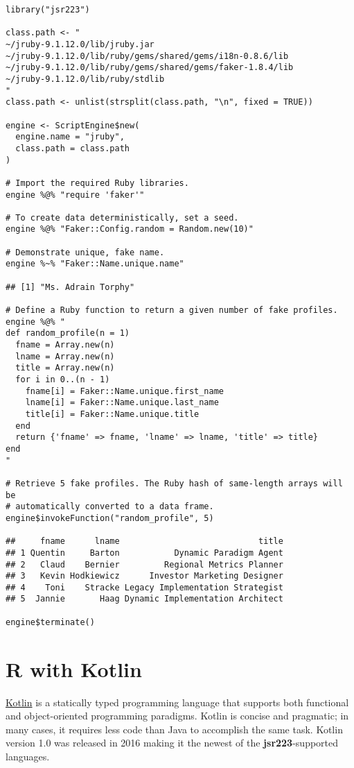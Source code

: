 \documentclass[
article,
11pt, %
a4paper, %
oneside, %
headinclude,footinclude, %
]{scrartcl}
\theoremstyle{definition} %
\theoremstyle{plain} %
\theoremstyle{remark} %
\newcommand{\pkg}[1]{\textbf{#1}}
\begin{document}
\begin{verbatim}
library("jsr223")

class.path <- "
~/jruby-9.1.12.0/lib/jruby.jar
~/jruby-9.1.12.0/lib/ruby/gems/shared/gems/i18n-0.8.6/lib
~/jruby-9.1.12.0/lib/ruby/gems/shared/gems/faker-1.8.4/lib
~/jruby-9.1.12.0/lib/ruby/stdlib
"
class.path <- unlist(strsplit(class.path, "\n", fixed = TRUE))

engine <- ScriptEngine$new(
  engine.name = "jruby",
  class.path = class.path
)

# Import the required Ruby libraries.
engine %@% "require 'faker'"

# To create data deterministically, set a seed.
engine %@% "Faker::Config.random = Random.new(10)"

# Demonstrate unique, fake name.
engine %~% "Faker::Name.unique.name"

## [1] "Ms. Adrain Torphy"

# Define a Ruby function to return a given number of fake profiles.
engine %@% "
def random_profile(n = 1)
  fname = Array.new(n)
  lname = Array.new(n)
  title = Array.new(n)
  for i in 0..(n - 1)
    fname[i] = Faker::Name.unique.first_name
    lname[i] = Faker::Name.unique.last_name
    title[i] = Faker::Name.unique.title
  end
  return {'fname' => fname, 'lname' => lname, 'title' => title}
end
"

# Retrieve 5 fake profiles. The Ruby hash of same-length arrays will be
# automatically converted to a data frame.
engine$invokeFunction("random_profile", 5)

##     fname      lname                            title
## 1 Quentin     Barton           Dynamic Paradigm Agent
## 2   Claud    Bernier         Regional Metrics Planner
## 3   Kevin Hodkiewicz      Investor Marketing Designer
## 4    Toni    Stracke Legacy Implementation Strategist
## 5  Jannie       Haag Dynamic Implementation Architect

engine$terminate()
\end{verbatim}

\hypertarget{r-with-kotlin}{}
\section{R with Kotlin}

\href{https://kotlinlang.org/}{Kotlin} is a statically typed programming language that supports both functional and object-oriented programming paradigms. Kotlin is concise and pragmatic; in many cases, it requires less code than Java to accomplish the same task. Kotlin version 1.0 was released in 2016 \citep{kotlin-release} making it the newest of the \pkg{jsr223}-supported languages. 
\end{document}
